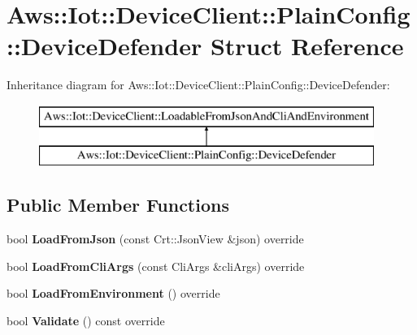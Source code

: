 \hypertarget{struct_aws_1_1_iot_1_1_device_client_1_1_plain_config_1_1_device_defender}{}\section{Aws\+:\+:Iot\+:\+:Device\+Client\+:\+:Plain\+Config\+:\+:Device\+Defender Struct Reference}
\label{struct_aws_1_1_iot_1_1_device_client_1_1_plain_config_1_1_device_defender}
Inheritance diagram for Aws\+:\+:Iot\+:\+:Device\+Client\+:\+:Plain\+Config\+:\+:Device\+Defender\+:\begin{figure}[H]
\begin{center}
\leavevmode
\includegraphics[height=2.000000cm]{struct_aws_1_1_iot_1_1_device_client_1_1_plain_config_1_1_device_defender}
\end{center}
\end{figure}
\subsection*{Public Member Functions}
\begin{DoxyCompactItemize}
\item 
\mbox{\label{struct_aws_1_1_iot_1_1_device_client_1_1_plain_config_1_1_device_defender_a03e9f5cb08c3e3dd87629488df9a15c2}} 
bool {\bfseries Load\+From\+Json} (const Crt\+::\+Json\+View \&json) override
\item 
\mbox{\label{struct_aws_1_1_iot_1_1_device_client_1_1_plain_config_1_1_device_defender_a26abac0d7ba9adbbe28ed43252b68268}} 
bool {\bfseries Load\+From\+Cli\+Args} (const Cli\+Args \&cli\+Args) override
\item 
\mbox{\label{struct_aws_1_1_iot_1_1_device_client_1_1_plain_config_1_1_device_defender_a0f48a02304ceb73f818b9386211d1244}} 
bool {\bfseries Load\+From\+Environment} () override
\item 
\mbox{\label{struct_aws_1_1_iot_1_1_device_client_1_1_plain_config_1_1_device_defender_ad157a10deb0fef6762d9a4283c3f00e3}} 
bool {\bfseries Validate} () const override
\end{DoxyCompactItemize}
